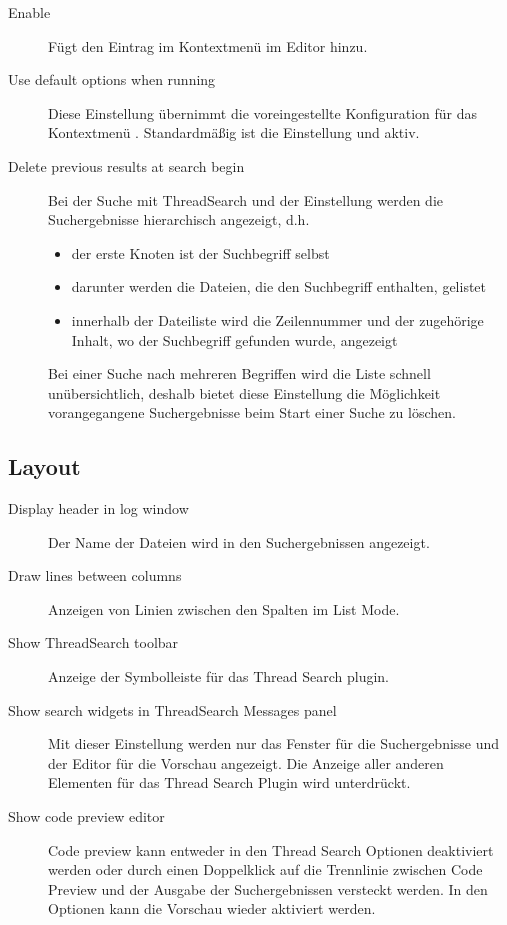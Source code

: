 \begin{description}
\item[Enable ] Fügt den Eintrag  im Kontextmenü im Editor hinzu.
\item[Use default options when running ] Diese Einstellung übernimmt die voreingestellte Konfiguration für das Kontextmenü . Standardmäßig ist die Einstellung  und  aktiv.
\item[Delete previous results at search begin] Bei der Suche mit ThreadSearch und der Einstellung  werden die Suchergebnisse hierarchisch angezeigt, d.h.
\begin{itemize}
\item der erste Knoten ist der Suchbegriff selbst
\item darunter werden die Dateien, die den Suchbegriff enthalten, gelistet
\item innerhalb der Dateiliste wird die Zeilennummer und der zugehörige Inhalt, wo der Suchbegriff gefunden wurde, angezeigt
\end{itemize}
Bei einer Suche nach mehreren Begriffen wird die Liste schnell unübersichtlich, deshalb bietet diese Einstellung die Möglichkeit vorangegangene Suchergebnisse beim Start einer Suche zu löschen.
\end{description}

\subsection{Layout}

\begin{description}
\item[Display header in log window] Der Name der Dateien wird in den Suchergebnissen angezeigt.
\item[Draw lines between columns] Anzeigen von Linien zwischen den Spalten im List Mode.
\item[Show ThreadSearch toolbar] Anzeige der Symbolleiste für das Thread Search plugin.
\item[Show search widgets in ThreadSearch Messages panel] Mit dieser Einstellung werden nur das Fenster für die Suchergebnisse und der Editor für die Vorschau angezeigt. Die Anzeige aller anderen Elementen für das Thread Search Plugin wird unterdrückt.
\item[Show code preview editor] Code preview kann entweder in den Thread Search Optionen deaktiviert werden oder durch einen Doppelklick auf die Trennlinie zwischen Code Preview und der Ausgabe der Suchergebnissen versteckt werden. In den Optionen kann die Vorschau wieder aktiviert werden.
\end{description}

